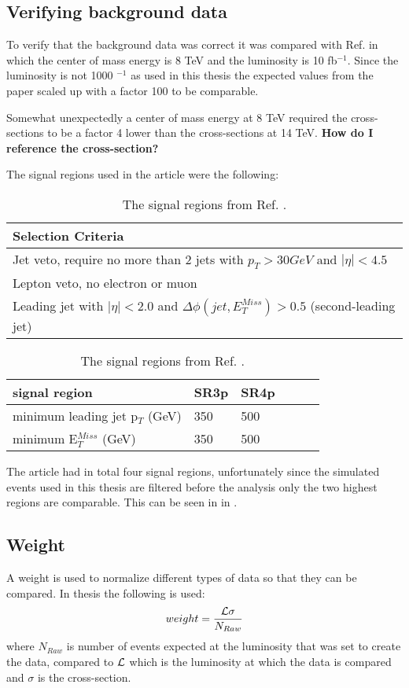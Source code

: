 \subsection{Verifying background data} 	
To verify that the background data was correct it was compared with Ref. \citep{ATLAS-CONF-2012-147} in which the center of mass energy is 8 TeV and the luminosity is 10 fb$^{-1}$. Since the luminosity is not 1000 $^{-1}$ as used in this thesis the expected values from the paper scaled up with a factor 100 to be comparable. 

Somewhat unexpectedly a center of mass energy at 8 TeV required the cross-sections to be a factor 4 lower than the cross-sections at 14 TeV. \textbf{How do I reference the cross-section?}

The signal regions used in the article were the following:
\begin{table}[h]
\begin{center}
\begin{tabular}{l}
\hline
Selection Criteria \\ \hline
Jet veto, require no more than 2 jets with $p_T > 30 GeV$ and $|\eta| < 4.5$ \\
Lepton veto, no electron or muon \\
Leading jet with $|\eta| < 2.0$ and $\Delta \phi (jet, E_T^{Miss})>0.5$ (second-leading jet) \\ \hline
\end{tabular}
\begin{tabular}{l l l l l l}
signal region & SR3p & SR4p \\ \hline
minimum leading jet p$_T$ (GeV) & 350 & 500 \\
minimum E$^{Miss}_T$ (GeV) & 350 & 500 \\ \hline
\end{tabular}
\label{tab:oldsr}
\caption{The signal regions from Ref. \citep{ATLAS-CONF-2012-147}.}
\end{center}
\end{table}

The article had in total four signal regions, unfortunately since the simulated events used in this thesis are filtered before the analysis only the two highest regions are comparable. This can be seen in  in .

\subsection{Weight}
A weight is used to normalize different types of data so that they can be compared. In thesis the following is used:
\begin{equation}
weight=\frac{\mathcal{L} \sigma}{N_{Raw}}
\end{equation}
where $N_{Raw}$ is number of events expected at the luminosity that was set to create the data, compared to $\mathcal{L}$ which is the luminosity at which the data is compared and $\sigma$ is the cross-section.

